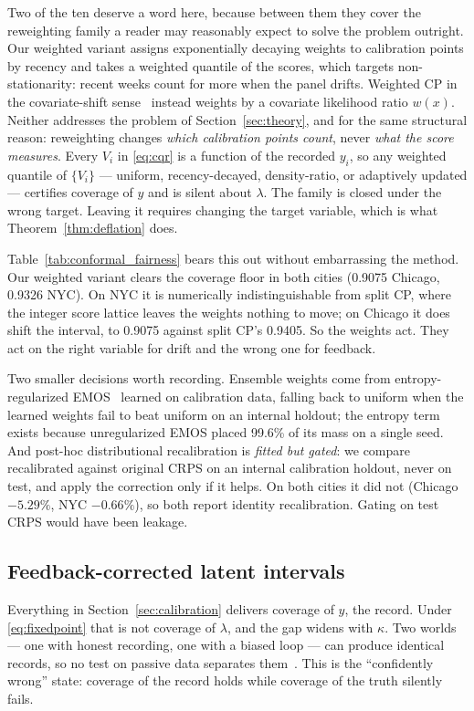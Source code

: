 \documentclass[journal,10pt,twocolumn]{IEEEtran}
\begin{document}
Two of the ten deserve a word here, because between them they cover the
reweighting family a reader may reasonably expect to solve the problem outright.
Our weighted variant assigns exponentially decaying weights to calibration points
by recency and takes a weighted quantile of the scores, which targets
non-stationarity: recent weeks count for more when the panel drifts. Weighted CP
in the covariate-shift sense~\cite{tibshirani2019conformal} instead weights by a
covariate likelihood ratio $w(x)$. Neither addresses the problem of
Section~\ref{sec:theory}, and for the same structural reason: reweighting changes
\emph{which calibration points count}, never \emph{what the score measures}. Every
$V_i$ in \eqref{eq:cqr} is a function of the recorded $y_i$, so any weighted
quantile of $\{V_i\}$ --- uniform, recency-decayed, density-ratio, or adaptively
updated --- certifies coverage of $y$ and is silent about $\lambda$. The family is
closed under the wrong target. Leaving it requires changing the target variable,
which is what Theorem~\ref{thm:deflation} does.

Table~\ref{tab:conformal_fairness} bears this out without embarrassing the method.
Our weighted variant clears the coverage floor in both cities (0.9075 Chicago,
0.9326 NYC). On NYC it is numerically indistinguishable from split CP, where the
integer score lattice leaves the weights nothing to move; on Chicago it does shift
the interval, to 0.9075 against split CP's 0.9405. So the weights act. They act on
the right variable for drift and the wrong one for feedback.

Two smaller decisions worth recording. Ensemble weights come from
entropy-regularized EMOS~\cite{gneiting2005calibrated} learned on calibration
data, falling back to uniform when the learned weights fail to beat uniform on an
internal holdout; the entropy term exists because unregularized EMOS placed
99.6\% of its mass on a single seed. And post-hoc distributional recalibration is
\emph{fitted but gated}: we compare recalibrated against original CRPS on an
internal calibration holdout, never on test, and apply the correction only if it
helps. On both cities it did not (Chicago $-5.29\%$, NYC $-0.66\%$), so both
report identity recalibration. Gating on test CRPS would have been leakage.

\subsection{Feedback-corrected latent intervals}
\label{sec:latent}
Everything in Section~\ref{sec:calibration} delivers coverage of $y$, the record.
Under \eqref{eq:fixedpoint} that is not coverage of $\lambda$, and the gap widens
with $\kappa$. Two worlds --- one with honest recording, one with a biased loop
--- can produce identical records, so no test on passive data separates
them~\cite{mendler2022anticipating}. This is the ``confidently wrong'' state:
coverage of the record holds while coverage of the truth silently fails.
\end{document}

